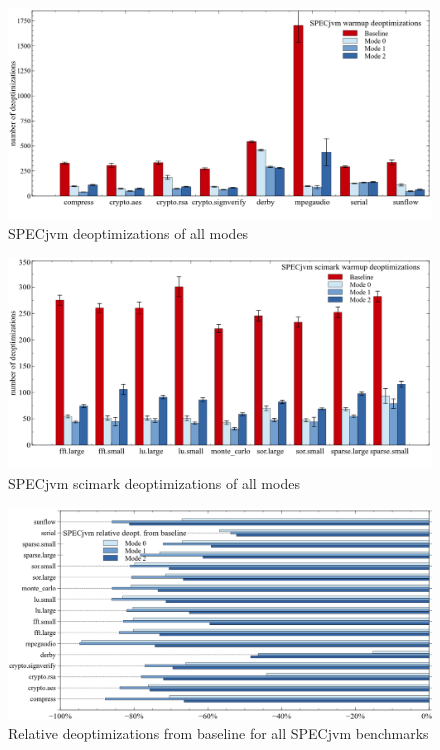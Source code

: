 \begin{figure}[ht]
  \begin{center}
    \centering
    \includegraphics[width=1.0\textwidth]{figures/others_warmup_deopt.png}
    \caption{SPECjvm deoptimizations of all modes}
    \label{f:others_warmup_deopt}
  \end{center}
\end{figure}
\begin{figure}[ht]
  \begin{center}
    \centering
    \includegraphics[width=1.0\textwidth]{figures/scimark_warmup_deopt.png}
    \caption{SPECjvm scimark deoptimizations of all modes}
    \label{f:scimark_warmup_deopt}
  \end{center}
\end{figure}
\begin{figure}[ht]
  \begin{center}
    \centering
    \includegraphics[width=1.0\textwidth]{figures/all_warmup_variation_deopt.png}
    \caption{Relative deoptimizations from baseline for all SPECjvm benchmarks}
    \label{f:all_warmup_variation_deopt}
  \end{center}
\end{figure}
